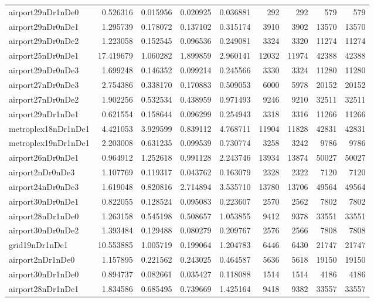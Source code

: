 \begin{longtable}{|l|r|r|r|r|r|r|r|r|}
airport29nDr1nDe0 & 0.526316 & 0.015956 & 0.020925 & 0.036881 & 292 & 292 & 579 & 579 \\
airport29nDr0nDe1 & 1.295739 & 0.178072 & 0.137102 & 0.315174 & 3910 & 3902 & 13570 & 13570 \\
airport29nDr0nDe2 & 1.223058 & 0.152545 & 0.096536 & 0.249081 & 3324 & 3320 & 11274 & 11274 \\
airport25nDr0nDe1 & 17.419679 & 1.060282 & 1.899859 & 2.960141 & 12032 & 11974 & 42388 & 42388 \\
airport29nDr0nDe3 & 1.699248 & 0.146352 & 0.099214 & 0.245566 & 3330 & 3324 & 11280 & 11280 \\
airport27nDr0nDe3 & 2.754386 & 0.338170 & 0.170883 & 0.509053 & 6000 & 5978 & 20152 & 20152 \\
airport27nDr0nDe2 & 1.902256 & 0.532534 & 0.438959 & 0.971493 & 9246 & 9210 & 32511 & 32511 \\
airport29nDr1nDe1 & 0.621554 & 0.158644 & 0.096299 & 0.254943 & 3318 & 3316 & 11266 & 11266 \\
metroplex18nDr1nDe1 & 4.421053 & 3.929599 & 0.839112 & 4.768711 & 11904 & 11828 & 42831 & 42831 \\
metroplex19nDr1nDe1 & 2.203008 & 0.631235 & 0.099539 & 0.730774 & 3258 & 3242 & 9786 & 9786 \\
airport26nDr0nDe1 & 0.964912 & 1.252618 & 0.991128 & 2.243746 & 13934 & 13874 & 50027 & 50027 \\
airport2nDr0nDe3 & 1.107769 & 0.119317 & 0.043762 & 0.163079 & 2328 & 2322 & 7120 & 7120 \\
airport24nDr0nDe3 & 1.619048 & 0.820816 & 2.714894 & 3.535710 & 13780 & 13706 & 49564 & 49564 \\
airport30nDr0nDe1 & 0.822055 & 0.128524 & 0.095083 & 0.223607 & 2570 & 2562 & 7802 & 7802 \\
airport28nDr1nDe0 & 1.263158 & 0.545198 & 0.508657 & 1.053855 & 9412 & 9378 & 33551 & 33551 \\
airport30nDr0nDe2 & 1.393484 & 0.129488 & 0.080279 & 0.209767 & 2576 & 2566 & 7808 & 7808 \\
grid19nDr1nDe1 & 10.553885 & 1.005719 & 0.199064 & 1.204783 & 6446 & 6430 & 21747 & 21747 \\
airport2nDr1nDe0 & 1.157895 & 0.221562 & 0.243025 & 0.464587 & 5636 & 5618 & 19150 & 19150 \\
airport30nDr1nDe0 & 0.894737 & 0.082661 & 0.035427 & 0.118088 & 1514 & 1514 & 4186 & 4186 \\
airport28nDr1nDe1 & 1.834586 & 0.685495 & 0.739669 & 1.425164 & 9418 & 9382 & 33557 & 33557 \\

\end{longtable}
